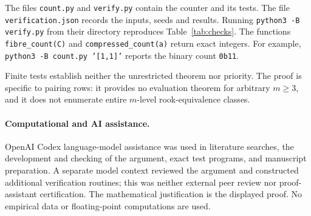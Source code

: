 \documentclass[11pt]{article}
\theoremstyle{remark}
\begin{document}
The files \texttt{count.py} and \texttt{verify.py} contain the counter
and its tests. The file \texttt{verification.json} records the inputs,
seeds and results. Running \texttt{python3 -B verify.py} from their
directory reproduces Table~\ref{tab:checks}. The functions
\texttt{fibre\_count(C)} and \texttt{compressed\_count(a)} return
exact integers. For example,
\texttt{python3 -B count.py '[1,1]'} reports the binary count
\texttt{0b11}.

Finite tests establish neither the unrestricted theorem nor priority.
The proof is specific to pairing rows: it provides no evaluation
theorem for arbitrary $m\geq3$, and it does not enumerate entire
$m$-level rook-equivalence classes.

\paragraph{Computational and AI assistance.}
OpenAI Codex language-model assistance was used in literature searches,
the development and checking of the argument, exact test programs,
and manuscript preparation. A separate model context reviewed the
argument and constructed additional verification routines; this was
neither external peer review nor proof-assistant certification.
The mathematical justification is the displayed proof. No empirical
data or floating-point computations are used.



\end{document}
